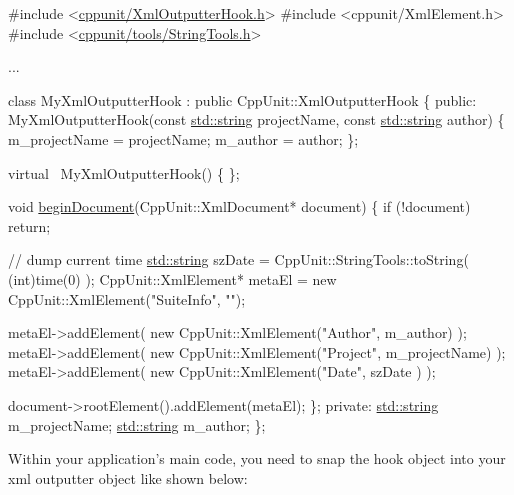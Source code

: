 \begin{DoxyCode}
\textcolor{preprocessor}{#include <\hyperlink{_xml_outputter_hook_8h}{cppunit/XmlOutputterHook.h}>}
\textcolor{preprocessor}{#include <cppunit/XmlElement.h>}
\textcolor{preprocessor}{#include <\hyperlink{_string_tools_8h}{cppunit/tools/StringTools.h}>}

...

class MyXmlOutputterHook : \textcolor{keyword}{public} CppUnit::XmlOutputterHook
\{
\textcolor{keyword}{public}:
  MyXmlOutputterHook(\textcolor{keyword}{const} \hyperlink{glew_8h_ae84541b4f3d8e1ea24ec0f466a8c568b}{std::string} projectName,
                     \textcolor{keyword}{const} \hyperlink{glew_8h_ae84541b4f3d8e1ea24ec0f466a8c568b}{std::string} author)
  \{
     m\_projectName = projectName;
     m\_author      = author;
  \};

  \textcolor{keyword}{virtual} ~MyXmlOutputterHook()
  \{
  \};

  \textcolor{keywordtype}{void} \hyperlink{class_xml_outputter_hook_a1d2b5d5d0fc42d273d6430522a70ccbb}{beginDocument}(CppUnit::XmlDocument* document)
  \{
    \textcolor{keywordflow}{if} (!document)
      \textcolor{keywordflow}{return};

    \textcolor{comment}{// dump current time}
    \hyperlink{glew_8h_ae84541b4f3d8e1ea24ec0f466a8c568b}{std::string} szDate          = CppUnit::StringTools::toString( (\textcolor{keywordtype}{int})time(0) );
    CppUnit::XmlElement* metaEl = \textcolor{keyword}{new} CppUnit::XmlElement(\textcolor{stringliteral}{"SuiteInfo"}, 
                                                          \textcolor{stringliteral}{""});

    metaEl->addElement( \textcolor{keyword}{new} CppUnit::XmlElement(\textcolor{stringliteral}{"Author"}, m\_author) );
    metaEl->addElement( \textcolor{keyword}{new} CppUnit::XmlElement(\textcolor{stringliteral}{"Project"}, m\_projectName) );
    metaEl->addElement( \textcolor{keyword}{new} CppUnit::XmlElement(\textcolor{stringliteral}{"Date"}, szDate ) );
   
    document->rootElement().addElement(metaEl);
  \};
\textcolor{keyword}{private}:
  \hyperlink{glew_8h_ae84541b4f3d8e1ea24ec0f466a8c568b}{std::string} m\_projectName;
  \hyperlink{glew_8h_ae84541b4f3d8e1ea24ec0f466a8c568b}{std::string} m\_author;
\}; 
\end{DoxyCode}


Within your application's main code, you need to snap the hook object into your xml outputter object like shown below\-:


